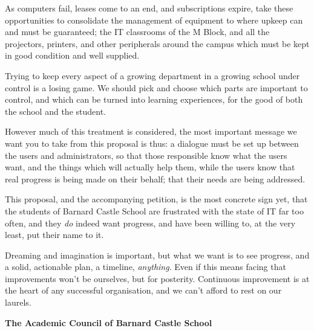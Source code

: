 \documentclass[a4paper,leqno,titlepage]{article}
\begin{document}
As computers fail, leases come to an end, and subscriptions expire,
take these opportunities to consolidate the management of equipment to where
upkeep can and must be guaranteed; the IT classrooms of the M Block,
and all the projectors, printers, and other peripherals
around the campus which must be kept in good condition and well supplied.


Trying to keep every aspect of a growing department in a growing school
under control is a losing game. We should pick and choose which parts
are important to control, and which can be turned into learning experiences,
for the good of both the school and the student.


However much of this treatment is considered, the most important message we
want you to take from this proposal is thus: a dialogue must be set up between
the users and administrators, so that those responsible know what the users want,
and the things which will actually help them, while the users know that real
progress is being made on their behalf; that their needs are being addressed.


This proposal, and the accompanying petition, is the most
concrete sign yet, that the students of Barnard Castle School are
frustrated with the state of IT far too often, and they \emph{do} indeed want
progress, and have been willing to, at the very least, put their name to it.


Dreaming and imagination is important, but what we want is to see progress,
and a solid, actionable plan, a timeline, \emph{anything}. Even if this means
facing that improvements won't be ourselves, but for posterity.
Continuous improvement is at the heart of any successful organisation,
and we can't afford to rest on our laurels.



\vspace{4cm}\hspace{3cm}\textbf{The Academic Council of Barnard Castle School}
\end{document}
